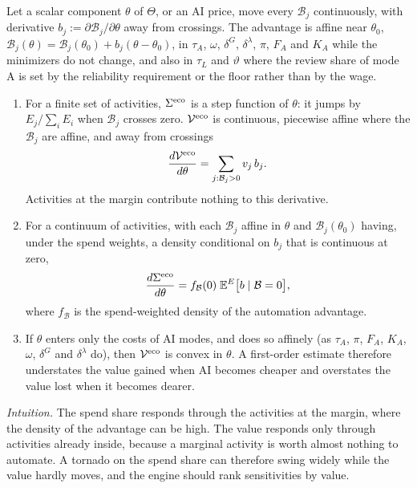 \begin{proposition}\label{prop:ext-margin}
Let a scalar component $\theta$ of $\Theta$, or an AI price, move every $\mathcal B_j$ continuously, with derivative $b_j:=\partial\mathcal B_j/\partial\theta$ away from crossings. The advantage is affine near $\theta_0$, $\mathcal B_j(\theta)=\mathcal B_j(\theta_0)+b_j(\theta-\theta_0)$, in $\tau_A$, $\omega$, $\delta^G$, $\delta^\lambda$, $\pi$, $F_A$ and $K_A$ while the minimizers do not change, and also in $\tau_L$ and $\vartheta$ where the review share of mode A is set by the reliability requirement or the floor rather than by the wage.
\begin{enumerate}
\item[(a)] For a finite set of activities, $\Sigma^{\rm eco}$ is a step function of $\theta$: it jumps by $E_j/\sum_iE_i$ when $\mathcal B_j$ crosses zero. $\mathcal V^{\rm eco}$ is continuous, piecewise affine where the $\mathcal B_j$ are affine, and away from crossings
\begin{equation}\label{eq:ext-envelope}
\frac{d\mathcal V^{\rm eco}}{d\theta}=\sum_{j:\mathcal B_j>0}v_j\,b_j .
\end{equation}
Activities at the margin contribute nothing to this derivative.
\item[(b)] For a continuum of activities, with each $\mathcal B_j$ affine in $\theta$ and $\mathcal B_j(\theta_0)$ having, under the spend weights, a density conditional on $b_j$ that is continuous at zero,
\begin{equation}\label{eq:ext-density}
\frac{d\Sigma^{\rm eco}}{d\theta}=f_{\mathcal B}(0)\;\mathbb E^E\bigl[b\mid\mathcal B=0\bigr],
\end{equation}
where $f_{\mathcal B}$ is the spend-weighted density of the automation advantage.
\item[(c)] If $\theta$ enters only the costs of AI modes, and does so affinely (as $\tau_A$, $\pi$, $F_A$, $K_A$, $\omega$, $\delta^G$ and $\delta^\lambda$ do), then $\mathcal V^{\rm eco}$ is convex in $\theta$. A first-order estimate therefore understates the value gained when AI becomes cheaper and overstates the value lost when it becomes dearer.
\end{enumerate}
\end{proposition}

\noindent\emph{Intuition.} The spend share responds through the activities at the margin, where the density of the advantage can be high. The value responds only through activities already inside, because a marginal activity is worth almost nothing to automate. A tornado on the spend share can therefore swing widely while the value hardly moves, and the engine should rank sensitivities by value.

